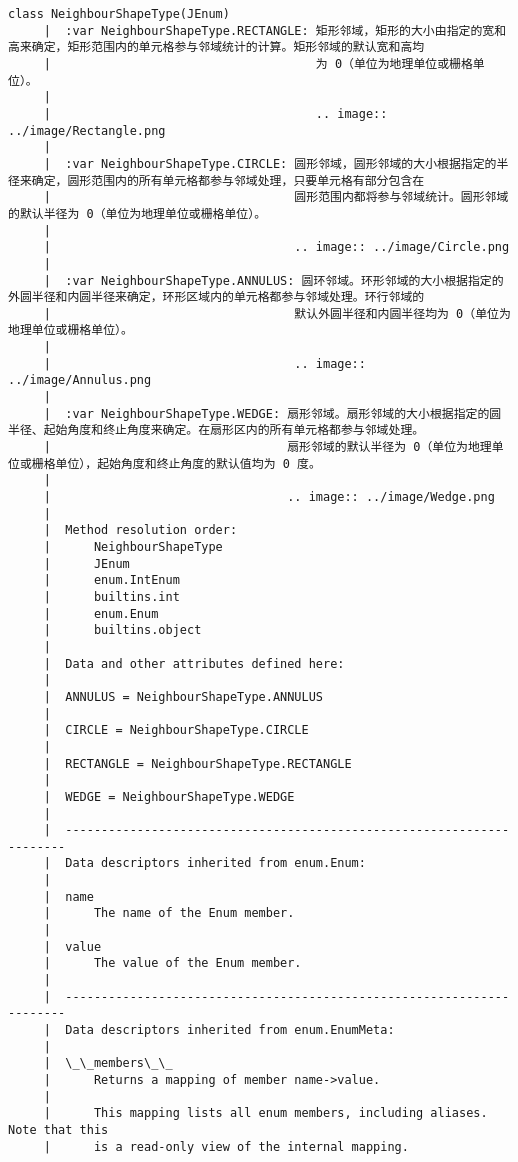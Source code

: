 \documentclass[11pt]{article}
\begin{document}
\begin{Verbatim}[commandchars=\\\{\}]
    class NeighbourShapeType(JEnum)
     |  :var NeighbourShapeType.RECTANGLE: 矩形邻域，矩形的大小由指定的宽和高来确定，矩形范围内的单元格参与邻域统计的计算。矩形邻域的默认宽和高均
     |                                     为 0（单位为地理单位或栅格单位）。
     |  
     |                                     .. image:: ../image/Rectangle.png
     |  
     |  :var NeighbourShapeType.CIRCLE: 圆形邻域，圆形邻域的大小根据指定的半径来确定，圆形范围内的所有单元格都参与邻域处理，只要单元格有部分包含在
     |                                  圆形范围内都将参与邻域统计。圆形邻域的默认半径为 0（单位为地理单位或栅格单位）。
     |  
     |                                  .. image:: ../image/Circle.png
     |  
     |  :var NeighbourShapeType.ANNULUS: 圆环邻域。环形邻域的大小根据指定的外圆半径和内圆半径来确定，环形区域内的单元格都参与邻域处理。环行邻域的
     |                                  默认外圆半径和内圆半径均为 0（单位为地理单位或栅格单位）。
     |  
     |                                  .. image:: ../image/Annulus.png
     |  
     |  :var NeighbourShapeType.WEDGE: 扇形邻域。扇形邻域的大小根据指定的圆半径、起始角度和终止角度来确定。在扇形区内的所有单元格都参与邻域处理。
     |                                 扇形邻域的默认半径为 0（单位为地理单位或栅格单位），起始角度和终止角度的默认值均为 0 度。
     |  
     |                                 .. image:: ../image/Wedge.png
     |  
     |  Method resolution order:
     |      NeighbourShapeType
     |      JEnum
     |      enum.IntEnum
     |      builtins.int
     |      enum.Enum
     |      builtins.object
     |  
     |  Data and other attributes defined here:
     |  
     |  ANNULUS = NeighbourShapeType.ANNULUS
     |  
     |  CIRCLE = NeighbourShapeType.CIRCLE
     |  
     |  RECTANGLE = NeighbourShapeType.RECTANGLE
     |  
     |  WEDGE = NeighbourShapeType.WEDGE
     |  
     |  ----------------------------------------------------------------------
     |  Data descriptors inherited from enum.Enum:
     |  
     |  name
     |      The name of the Enum member.
     |  
     |  value
     |      The value of the Enum member.
     |  
     |  ----------------------------------------------------------------------
     |  Data descriptors inherited from enum.EnumMeta:
     |  
     |  \_\_members\_\_
     |      Returns a mapping of member name->value.
     |      
     |      This mapping lists all enum members, including aliases. Note that this
     |      is a read-only view of the internal mapping.
    

\end{Verbatim}
\end{document}
